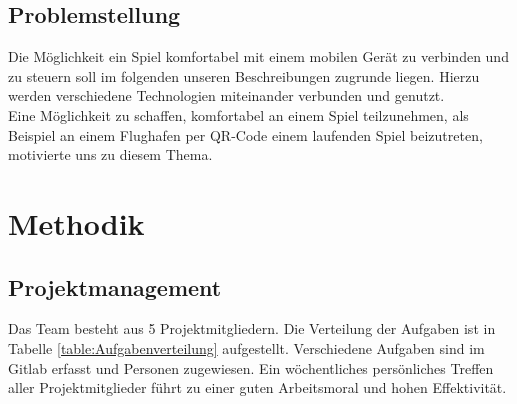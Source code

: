 \documentclass[a4paper]{spie}  %
\begin{document}
\subsection{Problemstellung}

Die Möglichkeit ein Spiel komfortabel mit einem mobilen Gerät zu verbinden und zu steuern soll im folgenden unseren Beschreibungen zugrunde liegen. Hierzu werden verschiedene Technologien miteinander verbunden und genutzt.\\
Eine Möglichkeit zu schaffen, komfortabel an einem Spiel teilzunehmen, als Beispiel an einem Flughafen per QR-Code einem laufenden Spiel beizutreten, motivierte uns zu diesem Thema.


\section{Methodik}
\subsection{Projektmanagement}
Das Team besteht aus 5 Projektmitgliedern. Die Verteilung der Aufgaben ist in Tabelle \ref{table:Aufgabenverteilung} aufgestellt.
Verschiedene Aufgaben sind im Gitlab erfasst und Personen zugewiesen. Ein wöchentliches persönliches Treffen aller Projektmitglieder führt zu einer guten Arbeitsmoral und hohen Effektivität.
\end{document}
